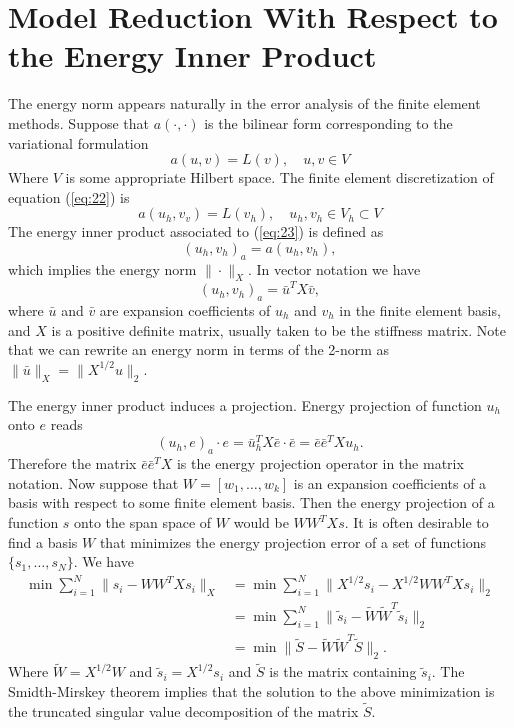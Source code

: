 \documentclass[12pt]{article}
\begin{document}
\section{Model Reduction With Respect to the Energy Inner Product}

The energy norm appears naturally in the error analysis of the finite element methods. Suppose that $a(\cdot,\cdot)$ is the bilinear form corresponding to the variational formulation
\begin{equation} \label{eq:22}
	a(u,v) = L(v), \quad u,v \in V
\end{equation}
Where $V$ is some appropriate Hilbert space. The finite element discretization of equation (\ref{eq:22}) is
\begin{equation} \label{eq:23}
	a(u_h,v_v) = L(v_h), \quad u_h,v_h\in V_h \subset V
\end{equation}
The energy inner product associated to (\ref{eq:23}) is defined as
\begin{equation} \label{eq:24}
	(u_h,v_h)_a = a(u_h,v_h),
\end{equation}
which implies the energy norm $\| \cdot \|_X$. In vector notation we have
\begin{equation} \label{eq:25}
	(u_h,v_h)_a = \bar u^T X \bar v,
\end{equation} 
where $\bar u$ and $\bar v$ are expansion coefficients of $u_h$ and $v_h$ in the finite element basis, and $X$ is a positive definite matrix, usually taken to be the stiffness matrix. Note that we can rewrite an energy norm in terms of the 2-norm as $\| \bar u \|_X = \| X^{1/2} u \|_2$.

The energy inner product induces a projection. Energy projection of function $u_h$ onto $e$ reads
\begin{equation} \label{eq:26}
	(u_h,e)_a \cdot e = \bar u_h^T X \bar e \cdot \bar e = \bar e \bar e^T X u_h. 
\end{equation}
Therefore the matrix $\bar e\bar e^T X$ is the energy projection operator in the matrix notation. Now suppose that $W = [ w_1,\dots,w_k ]$ is an expansion coefficients of a basis with respect to some finite element basis. Then the energy projection of a function $s$ onto the span space of $W$ would be $WW^TXs$. It is often desirable to find a basis $W$ that minimizes the energy projection error of a set of functions $\{s_1,\dots,s_N\}$. We have
\begin{equation} \label{eq:27}
\begin{aligned}
	\min \sum_{i=1}^N \| s_i - WW^TXs_i \|_X &= \min \sum_{i=1}^N \| X^{1/2} s_i - X^{1/2 }WW^TXs_i \|_2 \\
	&= \min \sum_{i=1}^N \| \tilde s_i - \tilde W \tilde W^T\tilde s_i \|_2 \\
	&= \min \| \tilde S - \tilde W \tilde W^T \tilde S \|_2.
\end{aligned}
\end{equation}
Where $\tilde W = X^{1/2} W$ and $\tilde s_i = X^{1/2} s_i$ and $\tilde S$ is the matrix containing $\tilde s_i$. The Smidth-Mirskey theorem implies that the solution to the above minimization is the truncated singular value decomposition of the matrix $\tilde S$.
\end{document}
